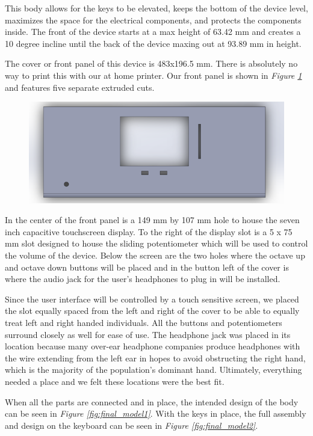 This body allows for the keys to be elevated, keeps the bottom of the device level, maximizes the space for the electrical components, and protects the components inside. The front of the device starts at a max height of 63.42 mm and creates a 10 degree incline until the back of the device maxing out at 93.89 mm in height.

The cover or front panel of this device is 483x196.5 mm. There is absolutely no way to print this with our at home printer. Our front panel is shown in \textit{Figure \ref{fig:display_model}} and features five separate extruded cuts.

\begin{figure}[h!]
  \centering
  \includegraphics[width=0.9\linewidth]{image/DisplayModel.png}
  \caption{}
  \label{fig:display_model}
\end{figure}

In the center of the front panel is a 149 mm by 107 mm hole to house the seven inch capacitive touchscreen display. To the right of the display slot is a 5 x 75 mm slot designed to house the sliding potentiometer which will be used to control the volume of the device. Below the screen are the two holes where the octave up and octave down buttons will be placed and in the button left of the cover is where the audio jack for the user’s headphones to plug in will be installed.

Since the user interface will be controlled by a touch sensitive screen, we placed the slot equally spaced from the left and right of the cover to be able to equally treat left and right handed individuals. All the buttons and potentiometers surround closely as well for ease of use. The headphone jack was placed in its location because many over-ear headphone companies produce headphones with the wire extending from the left ear in hopes to avoid obstructing the right hand, which is the majority of the population’s dominant hand. Ultimately, everything needed a place and we felt these locations were the best fit.

When all the parts are connected and in place, the intended design of the body can be seen in \textit{Figure \ref{fig:final_model1}}. With the keys in place, the full assembly and design on the keyboard can be seen in \textit{Figure \ref{fig:final_model2}}.

